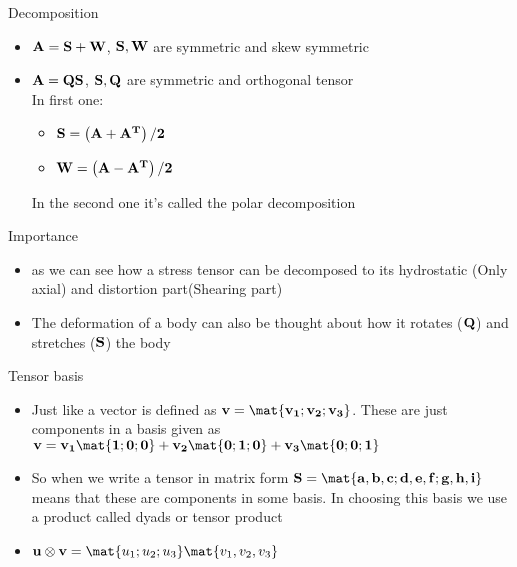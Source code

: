 	\begin{frame}{Decomposition}
		\begin{itemize}
			\item $\mathbf{A = S + W }$, $\mathbf{S,W}$ are symmetric and skew symmetric
			\item $\mathbf{A = QS }$, $\mathbf{S,Q}$ are symmetric and orthogonal tensor\\
			
			In first one:
			\begin{itemize}
				\item $\mathbf{S = \left(A+A^T \right)/2}$
				\item   $\mathbf{W =  \left(A-A^T \right)/2}$				
			\end{itemize}
			
			In the second one it's called the polar decomposition
		\end{itemize}
	
		\begin{block}{Importance}
			\begin{itemize}
				\item  as we can see how a stress tensor can be decomposed to its hydrostatic (Only axial) and distortion part(Shearing part)
				\item The deformation of a body can also be thought about how it rotates ($\mathbf{Q}$) and stretches ($\mathbf{S}$) the body
				
			\end{itemize}
		\end{block}
	\end{frame}


	\begin{frame}{Tensor basis}
		\begin{itemize}
			\item  Just  like a vector is defined as $\ve{v = \mat{v_1;v_2;v_3}}$. These are just components in a basis given as $\ve{v = v_1\mat{1;0;0}+v_2\mat{0;1;0}+v_3\mat{0;0;1}}$
			\item So when we write a tensor in matrix form $\ve{S = \mat{a,b,c;d,e,f;g,h,i}}$ means that these are components in some basis. In choosing this basis we use a product called dyads or tensor product
			\item $\ve{u \otimes v} = \mat{u_1;u_2;u_3}\mat{v_1,v_2,v_3}$
		\end{itemize}
	\end{frame}

	\begin{frame}
		
	\end{frame}